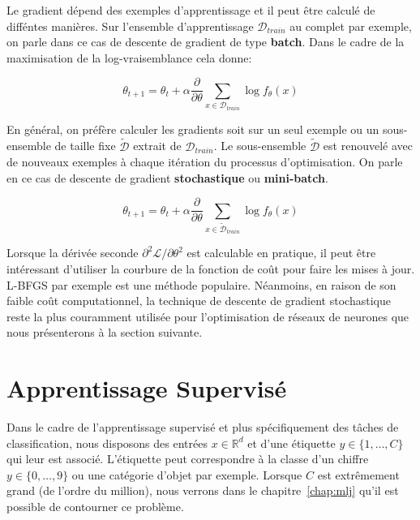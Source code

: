 Le gradient dépend des exemples d'apprentissage et il peut être calculé de
difféntes manières. Sur l'ensemble d'apprentissage $\mathcal{D}_{train}$ au
complet par exemple, on parle dans ce cas de descente de gradient de type
{\bf batch}. Dans le cadre de la maximisation de la log-vraisemblance cela donne:

\begin{equation}
\theta_{t+1} = \theta_{t} + \alpha \dfrac{\partial}{\partial\theta} \sum_{x\in\mathcal{D}_{train}}\log f_{\theta}(x)
\end{equation}

 En général, on préfère calculer les gradients soit sur un seul exemple ou un
 sous-ensemble de taille fixe $\tilde{\mathcal{D}}$ extrait de
 $\mathcal{D}_{train}$. Le sous-ensemble $\tilde{\mathcal{D}}$ est renouvelé
 avec de nouveaux exemples à chaque itération du processus d'optimisation. On
 parle en ce cas de descente de gradient {\bf stochastique} ou {\bf
 mini-batch}.

\begin{equation}
\theta_{t+1} = \theta_{t} + \alpha \dfrac{\partial}{\partial\theta} \sum_{x\in\tilde{\mathcal{D}}_{train}}\log f_{\theta}(x)
\end{equation}

Lorsque la dérivée seconde $\partial^{2}\mathcal{L}/\partial \theta^{2}$
est calculable en pratique, il peut être intéressant d'utiliser la courbure de la fonction de coût
pour faire les mises à jour. L-BFGS \citep{Byrd1995} par exemple est une méthode populaire.
Néanmoins, en raison de son faible coût computationnel, la technique de descente de gradient stochastique reste la plus
couramment utilisée pour l'optimisation de réseaux de neurones que nous présenterons à la section suivante. 

\section{Apprentissage Supervisé \label{sec:supervised}}

Dans le cadre de l'apprentissage supervisé et plus spécifiquement des tâches de classification, nous disposons des entrées
$x\in\mathbb{R}^{d}$ et d'une étiquette $y\in\{1,\dots ,C\}$ qui leur est associé.
L'étiquette peut correspondre à la classe d'un chiffre $y\in\{0,\dots ,9\}$ ou une
catégorie d'objet par exemple.  Lorsque $C$ est extrêmement grand (de l'ordre
du million), nous verrons dans le chapitre~\ref{chap:mlj} qu'il est possible de
contourner ce problème.
 
